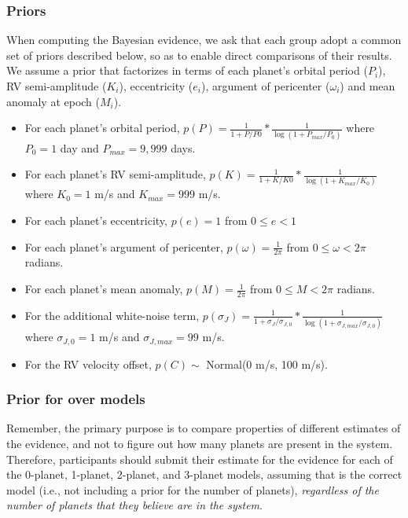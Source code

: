 \documentclass{article}
\begin{document}
\subsubsection{Priors}

When computing the Bayesian evidence, we ask that each group adopt a common set of priors described below, so as to enable direct comparisons of their results.  
We assume a prior that factorizes in terms of each planet's orbital period ($P_i$), RV semi-amplitude ($K_i$), eccentricity ($e_i$), argument of pericenter ($\omega_i$) and mean anomaly at epoch ($M_i$).
%
\begin{itemize}
\item For each planet's orbital period, $p(P) = \frac{1}{1+P/P0} *  \frac{1}{\log(1+P_{max}/P_0)}$ where $P_0=1$ day and $P_{max}=9,999$ days.
\item For each planet's RV semi-amplitude, $p(K) = \frac{1}{1+K/K0} *  \frac{1}{\log(1+K_{max}/K_0)}$ where $K_0=1$ m/s and $K_{max}=999$ m/s.
\item For each planet's eccentricity, $p(e) = 1$ from $0 \leq e < 1$
\item For each planet's argument of pericenter, $p(\omega) = \frac{1}{2\pi}$ from $0 \leq \omega < 2\pi$ radians.
\item For each planet's mean anomaly, $p(M) = \frac{1}{2\pi}$ from $0 \leq M < 2\pi$ radians.
\item For the additional white-noise term, $p(\sigma_J) = \frac{1}{1+\sigma_J/\sigma_{J,0}} *  \frac{1}{\log(1+\sigma_{J,max}/\sigma_{J,0})}$ where $\sigma_{J,0}=1$ m/s and $\sigma_{J,max}=99$ m/s.
\item For the RV velocity offset, $p(C) \sim$ Normal(0 m/s, 100 m/s).
\end{itemize}

\subsubsection{Prior for over models}
Remember, the primary purpose is to compare properties of different estimates of the evidence, and not to figure out how many planets are present in the system.  
Therefore, participants should submit their estimate for the evidence for each of the 0-planet, 1-planet, 2-planet, and 3-planet models, assuming that is the correct model (i.e., not including a prior for the number of planets), {\em regardless of the number of planets that they believe are in the system}.  
\end{document}
